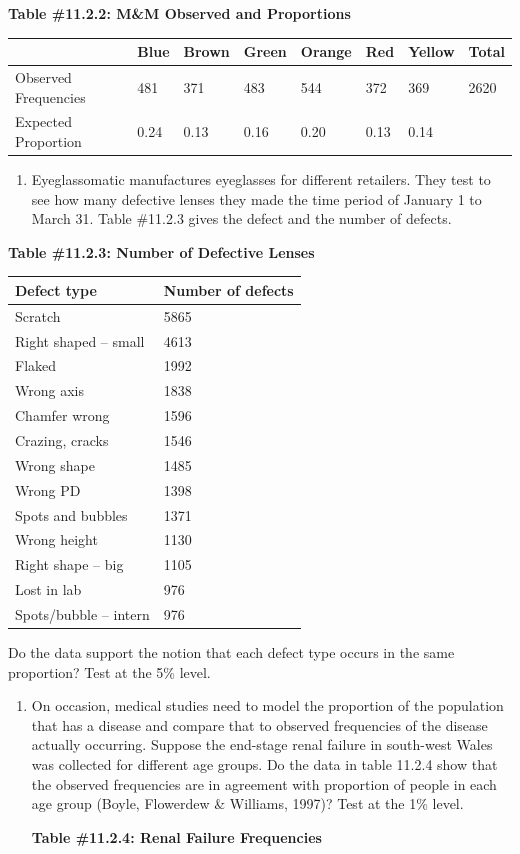 \documentclass[]{book}
\providecommand{\tightlist}{%
  \setlength{\itemsep}{0pt}\setlength{\parskip}{0pt}}
\begin{document}
\textbf{Table \#11.2.2: M\&M Observed and Proportions}

\begin{longtable}[]{@{}llllllll@{}}
\toprule
& Blue & Brown & Green & Orange & Red & Yellow & Total\tabularnewline
\midrule
\endhead
Observed Frequencies & 481 & 371 & 483 & 544 & 372 & 369 & 2620\tabularnewline
Expected Proportion & 0.24 & 0.13 & 0.16 & 0.20 & 0.13 & 0.14 &\tabularnewline
\bottomrule
\end{longtable}

\begin{enumerate}
\def\labelenumi{\arabic{enumi}.}
\setcounter{enumi}{1}
\tightlist
\item
  Eyeglassomatic manufactures eyeglasses for different retailers. They test to see how many defective lenses they made the time period of January 1 to March 31. Table \#11.2.3 gives the defect and the number of defects.
\end{enumerate}

\textbf{Table \#11.2.3: Number of Defective Lenses}

\begin{longtable}[]{@{}ll@{}}
\toprule
Defect type & Number of defects\tabularnewline
\midrule
\endhead
Scratch & 5865\tabularnewline
Right shaped -- small & 4613\tabularnewline
Flaked & 1992\tabularnewline
Wrong axis & 1838\tabularnewline
Chamfer wrong & 1596\tabularnewline
Crazing, cracks & 1546\tabularnewline
Wrong shape & 1485\tabularnewline
Wrong PD & 1398\tabularnewline
Spots and bubbles & 1371\tabularnewline
Wrong height & 1130\tabularnewline
Right shape -- big & 1105\tabularnewline
Lost in lab & 976\tabularnewline
Spots/bubble -- intern & 976\tabularnewline
\bottomrule
\end{longtable}

Do the data support the notion that each defect type occurs in the same proportion? Test at the 5\% level.

\begin{enumerate}
\def\labelenumi{\arabic{enumi}.}
\setcounter{enumi}{2}
\item
  On occasion, medical studies need to model the proportion of the population that has a disease and compare that to observed frequencies of the disease actually occurring. Suppose the end-stage renal failure in south-west Wales was collected for different age groups. Do the data in table 11.2.4 show that the observed frequencies are in agreement with proportion of people in each age group (Boyle, Flowerdew \& Williams, 1997)? Test at the 1\% level.

  \textbf{Table \#11.2.4: Renal Failure Frequencies}
\end{enumerate}
\end{document}
